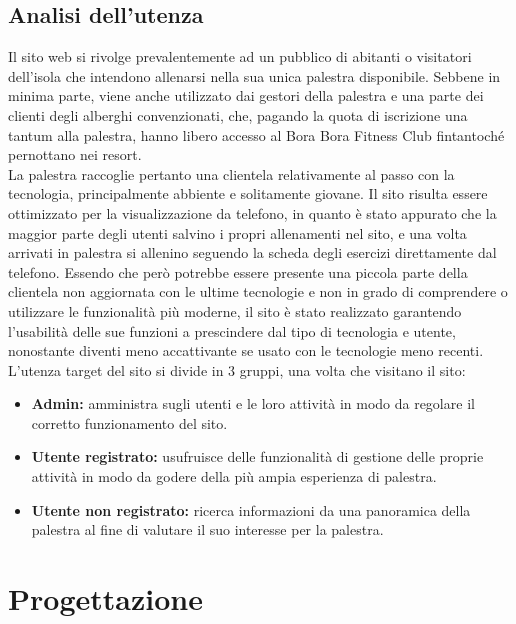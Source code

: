 \documentclass[a4paper]{article}
\begin{document}
	\subsection{Analisi dell'utenza}
	Il sito web si rivolge prevalentemente ad un pubblico di abitanti o visitatori dell'isola che intendono allenarsi nella sua unica palestra disponibile. Sebbene in minima parte, viene anche utilizzato dai gestori della palestra e una parte dei clienti degli alberghi convenzionati, che, pagando la quota di iscrizione una tantum alla palestra, hanno libero accesso al Bora Bora Fitness Club fintantoché pernottano nei resort.\\
	La palestra raccoglie pertanto una clientela relativamente al passo con la tecnologia, principalmente abbiente e solitamente giovane. Il sito risulta essere ottimizzato per la visualizzazione da telefono, in quanto è stato appurato che la maggior parte degli utenti salvino i propri allenamenti nel sito, e una volta arrivati in palestra si allenino seguendo la scheda degli esercizi direttamente dal telefono. Essendo che però potrebbe essere presente una piccola parte della clientela non aggiornata con le ultime tecnologie e non in grado di comprendere o utilizzare le funzionalità più moderne, il sito è stato realizzato garantendo l'usabilità delle sue funzioni a prescindere dal tipo di tecnologia e utente, nonostante diventi meno accattivante se usato con le tecnologie meno recenti.\\
	L'utenza target del sito si divide in 3 gruppi, una volta che visitano il sito:
	\begin{itemize}
		\item \textbf{Admin:} amministra sugli utenti e le loro attività in modo da regolare il corretto funzionamento del sito.
		\item \textbf{Utente registrato:} usufruisce delle funzionalità di gestione delle proprie attività in modo da godere della più ampia esperienza di palestra.
		\item \textbf{Utente non registrato:} ricerca informazioni da una panoramica della palestra al fine di valutare il suo interesse per la palestra.
		
	\end{itemize}

	\section{Progettazione}
\end{document}
